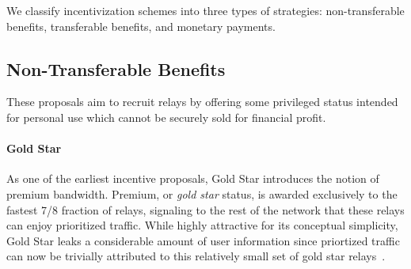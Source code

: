 We classify incentivization schemes into three types of strategies:
non-transferable benefits, transferable benefits, and monetary
payments.



\subsection{Non-Transferable Benefits}

These proposals aim to recruit relays by offering some privileged status
intended for personal use which cannot be securely sold for financial profit.

\paragraph*{Gold Star} As one of the earliest incentive proposals, Gold Star
introduces the notion of premium bandwidth. Premium, or \emph{gold star} status,
is awarded exclusively to the fastest 7/8 fraction of relays, signaling to the
rest of the network that these relays can enjoy prioritized traffic. While
highly attractive for its conceptual simplicity, Gold Star leaks a considerable
amount of user information since priortized traffic can now be trivially
attributed to this relatively small set of gold star
relays~\cite{dingledine2010building}.

